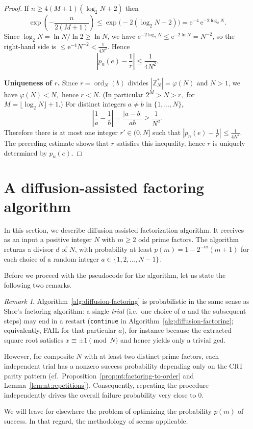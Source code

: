 \documentclass[11pt,reqno]{article}
\numberwithin{equation}{section}
\DeclareMathOperator{\ord}{ord}
\theoremstyle{plain}
\theoremstyle{definition}
\theoremstyle{remark}
\newtheorem{remark}[theorem]{Remark}
\newcommand{\Z}{\mathbb{Z}}
\newcommand{\e}{\mathrm{e}}
\begin{document}
\begin{proof}
If $n\ge 4(M+1)(\log_2 N+2)$ then
\[
\exp\!\left(-\frac{n}{2(M+1)}\right)\le \exp\!\bigl(-2(\log_2 N+2)\bigr)
= \e^{-4}\,\e^{-2\log_2 N}.
\]
Since $\log_2 N=\ln N/\ln 2\ge \ln N$, we have $\e^{-2\log_2 N}\le \e^{-2\ln N}=N^{-2}$,
so the right-hand side is $\le \e^{-4}N^{-2}<\frac{1}{4N^2}$. Hence
\[
  \left|p_n(e)-\frac{1}{r}\right|\le \frac{1}{4N^2}.
\]

\medskip\noindent\textbf{Uniqueness of $r$.}  Since $r=\ord_N(b)$ divides $|\Z_N^\ast|=\varphi(N)$ and $N>1$, we have
$\varphi(N)<N,$ hence $r<N$. (In particular $2^M>N>r,$ for $M=\lfloor\log_2 N\rfloor+1.$)
For distinct integers $a\neq b$ in $\{1,\dots,N\}$,
\[
  \left|\frac{1}{a}-\frac{1}{b}\right|
  =\frac{|a-b|}{ab}\ge \frac{1}{N^2}.
\]
Therefore there is at most one integer $r'\in(0,N]$ such that
$\left|p_n(e)-\frac{1}{r'}\right|\le \frac{1}{4N^2}$.
The preceding estimate shows that $r$ satisfies this inequality, hence $r$ is uniquely determined by $p_n(e)$.
\end{proof}



\section{A diffusion-assisted factoring algorithm}
\label{5}

In this section, we describe diffusion assisted factorization algorithm. It receives as an input a positive integer $N$ with $m\geq 2$ odd prime factors. The algorithm returns a divisor $d$ of $N$, with probability at least $p(m)=1-2^{-m}(m+1)$ for each choice of a random integer $a\in\{1,2,\ldots, N-1\}$.

Before we proceed with the pseudocode for the algorithm, let us state the following two remarks.

\begin{remark}\label{rem:algo-comments}
Algorithm~\ref{alg:diffusion-factoring} is probabilistic in the same sense as Shor's factoring algorithm:
a single \emph{trial} (i.e.\ one choice of $a$ and the subsequent steps) may end in a restart
(\texttt{continue} in Algorithm~\ref{alg:diffusion-factoring}; equivalently, \textsf{FAIL} for that particular $a$),
for instance because the extracted square root satisfies $x\equiv \pm 1\pmod N$ and hence yields only a trivial gcd.

However, for composite $N$ with at least two distinct prime factors, each independent trial has a nonzero success
probability depending only on the CRT parity pattern (cf.\ Proposition~\ref{prop:nt:factoring-to-order}
and Lemma~\ref{lem:nt:repetitions}). Consequently, repeating the procedure independently drives the overall
failure probability very close to $0$.

We will leave for elsewhere the problem of optimizing
the probability $p(m)$ of success. In that regard, the methodology of \cite{Za13} seems applicable.
\end{remark}
\end{document}
